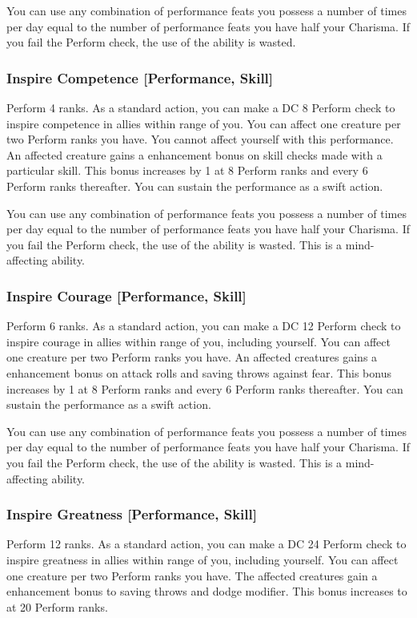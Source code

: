 You can use any combination of performance feats you possess a number of times per day equal to the number of performance feats you have \add half your Charisma. If you fail the Perform check, the use of the ability is wasted.

\subsubsection{Inspire Competence [Performance, Skill]}
\featpre Perform 4 ranks.
\featben As a standard action, you can make a DC 8 Perform check to inspire competence in allies within \rngmed range of you. You can affect one creature per two Perform ranks you have. You cannot affect yourself with this performance. An affected creature gains a  enhancement bonus on skill checks made with a particular skill. This bonus increases by 1 at 8 Perform ranks and every 6 Perform ranks thereafter. You can sustain the performance as a swift action.

You can use any combination of performance feats you possess a number of times per day equal to the number of performance feats you have \add half your Charisma. If you fail the Perform check, the use of the ability is wasted. This is a mind-affecting ability.

\subsubsection{Inspire Courage [Performance, Skill]}
\featpre Perform 6 ranks.
\featben As a standard action, you can make a DC 12 Perform check to inspire courage in allies within \rngmed range of you, including yourself. You can affect one creature per two Perform ranks you have. An affected creatures gains a  enhancement bonus on attack rolls and saving throws against fear. This bonus increases by 1 at 8 Perform ranks and every 6 Perform ranks thereafter. You can sustain the performance as a swift action. 

You can use any combination of performance feats you possess a number of times per day equal to the number of performance feats you have \add half your Charisma. If you fail the Perform check, the use of the ability is wasted. This is a mind-affecting ability.

\subsubsection{Inspire Greatness [Performance, Skill]}
\featpre Perform 12 ranks.
\featben As a standard action, you can make a DC 24 Perform check to inspire greatness in allies within \rngmed range of you, including yourself. You can affect one creature per two Perform ranks you have. The affected creatures gain a  enhancement bonus to saving throws and dodge modifier. This bonus increases to  at 20 Perform ranks.

